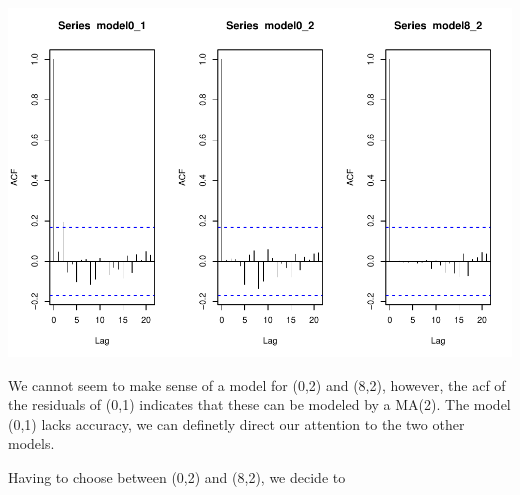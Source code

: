 \documentclass[]{article}
\begin{document}
\includegraphics{TP6_Analysis_Dejous_files/figure-latex/unnamed-chunk-9-1.pdf}

We cannot seem to make sense of a model for (0,2) and (8,2), however,
the acf of the residuals of (0,1) indicates that these can be modeled by
a MA(2). The model (0,1) lacks accuracy, we can definetly direct our
attention to the two other models.

Having to choose between (0,2) and (8,2), we decide to
\end{document}
